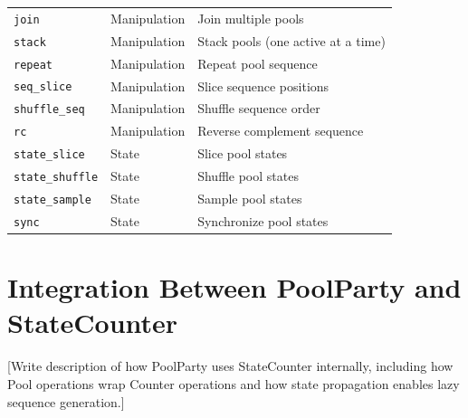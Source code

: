 \documentclass[11pt]{article}
\begin{document}
\begin{longtable}{@{}llp{7cm}@{}}
\texttt{join} & Manipulation & Join multiple pools \\
\texttt{stack} & Manipulation & Stack pools (one active at a time) \\
\texttt{repeat} & Manipulation & Repeat pool sequence \\
\texttt{seq_slice} & Manipulation & Slice sequence positions \\
\texttt{shuffle_seq} & Manipulation & Shuffle sequence order \\
\texttt{rc} & Manipulation & Reverse complement sequence \\
\addlinespace

\texttt{state_slice} & State & Slice pool states \\
\texttt{state_shuffle} & State & Shuffle pool states \\
\texttt{state_sample} & State & Sample pool states \\
\texttt{sync} & State & Synchronize pool states \\

\end{longtable}



\section{Integration Between PoolParty and StateCounter}
\label{sec:integration}

%

[Write description of how PoolParty uses StateCounter internally,
including how Pool operations wrap Counter operations and how
state propagation enables lazy sequence generation.]


\end{document}
